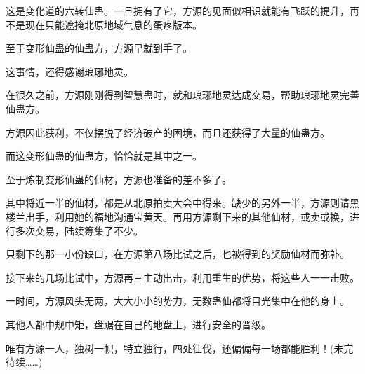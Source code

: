 \begin{this_body}
这是变化道的六转仙蛊。一旦拥有了它，方源的见面似相识就能有飞跃的提升，再不是现在只能遮掩北原地域气息的蛋疼版本。

至于变形仙蛊的仙蛊方，方源早就到手了。

这事情，还得感谢琅琊地灵。

在很久之前，方源刚刚得到智慧蛊时，就和琅琊地灵达成交易，帮助琅琊地灵完善仙蛊方。

方源因此获利，不仅摆脱了经济破产的困境，而且还获得了大量的仙蛊方。

而这变形仙蛊的仙蛊方，恰恰就是其中之一。

至于炼制变形仙蛊的仙材，方源也准备的差不多了。

其中将近一半的仙材，都是从北原拍卖大会中得来。缺少的另外一半，方源则请黑楼兰出手，利用她的福地沟通宝黄天。再用方源剩下来的其他仙材，或卖或换，进行多次交易，陆续筹集了不少。

只剩下的那一小份缺口，在方源第八场比试之后，也被得到的奖励仙材而弥补。

接下来的几场比试中，方源再三主动出击，利用重生的优势，将这些人一一击败。

一时间，方源风头无两，大大小小的势力，无数蛊仙都将目光集中在他的身上。

其他人都中规中矩，盘踞在自己的地盘上，进行安全的晋级。

唯有方源一人，独树一帜，特立独行，四处征伐，还偏偏每一场都能胜利！(未完待续……)

\end{this_body}

